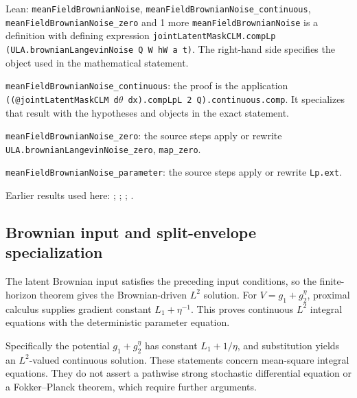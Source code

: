 \documentclass[11pt,a4paper]{report}
\begin{document}
\begin{leanbox}{Lean: \texttt{meanFieldBrownianNoise}, \texttt{meanFieldBrownianNoise\_\allowbreak{}continuous}, \texttt{meanFieldBrownianNoise\_\allowbreak{}zero} and 1 more}
\texttt{mean\allowbreak{}Field\allowbreak{}Brownian\allowbreak{}Noise} is a definition with defining expression \texttt{joint\allowbreak{}Latent\allowbreak{}Mask\allowbreak{}CLM.\allowbreak{}comp\allowbreak{}Lp (ULA.\allowbreak{}brownian\allowbreak{}Langevin\allowbreak{}Noise Q W h\allowbreak{}W a t)}. The right-hand side specifies the object used in the mathematical statement.



\texttt{mean\allowbreak{}Field\allowbreak{}Brownian\allowbreak{}Noise\_\allowbreak{}continuous}: the proof is the application \texttt{((@joint\allowbreak{}Latent\allowbreak{}Mask\allowbreak{}CLM d\ensuremath{\theta} dx).\allowbreak{}comp\allowbreak{}Lp\allowbreak{}L 2 Q).\allowbreak{}continuous.\allowbreak{}comp}. It specializes that result with the hypotheses and objects in the exact statement.



\texttt{mean\allowbreak{}Field\allowbreak{}Brownian\allowbreak{}Noise\_\allowbreak{}zero}: the source steps apply or rewrite \texttt{ULA.\allowbreak{}brownian\allowbreak{}Langevin\allowbreak{}Noise\_\allowbreak{}zero}, \texttt{map\_\allowbreak{}zero}.



\texttt{mean\allowbreak{}Field\allowbreak{}Brownian\allowbreak{}Noise\_\allowbreak{}parameter}: the source steps apply or rewrite \texttt{Lp.\allowbreak{}ext}.
\end{leanbox}


Earlier results used here: \cite[Section~3.25.1]{LangevinLean2026ULASC}; \cite[Section~3.25.2]{LangevinLean2026ULASC}; \cite[Section~3.25.3]{LangevinLean2026ULASC}; \cite[Section~3.1.1]{LangevinLean2026IPLA}.
\subsection{\texorpdfstring{Brownian input and split-envelope specialization}{Brownian input and split-envelope specialization}}
\label{report-step-ProximalLangevin-MeanFieldProcess-lean-10}


The latent Brownian input satisfies the preceding input conditions, so the finite-horizon theorem gives the Brownian-driven \(L^2\) solution. For \(V=g_1+g_2^\eta\), proximal calculus supplies gradient constant \(L_1+\eta^{-1}\). This proves continuous \(L^2\) integral equations with the deterministic parameter equation.



Specifically the potential \(g_1+g_2^\eta\) has constant \(L_1+1/\eta\), and substitution yields an \(L^2\)-valued continuous solution. These statements concern mean-square integral equations. They do not assert a pathwise strong stochastic differential equation or a Fokker–Planck theorem, which require further arguments.
\end{document}
